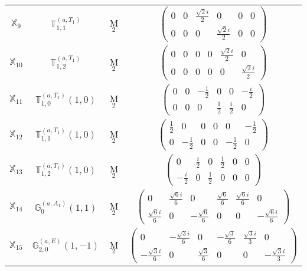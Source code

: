 \documentclass[fleqn,10pt,landscape]{article}
\begin{document}
\begin{itemize}
\begin{center}
\begin{longtable}{c|c|c|c}
$ \mathbb{X}_{9} $ & $\mathbb{T}_{1,1}^{(a,T_{1})}$ & M$_{2}$ & $\begin{pmatrix} 0 & 0 & \frac{\sqrt{2} i}{2} & 0 & 0 & 0 \\ 0 & 0 & 0 & \frac{\sqrt{2} i}{2} & 0 & 0 \end{pmatrix}$ \\
$ \mathbb{X}_{10} $ & $\mathbb{T}_{1,2}^{(a,T_{1})}$ & M$_{2}$ & $\begin{pmatrix} 0 & 0 & 0 & 0 & \frac{\sqrt{2} i}{2} & 0 \\ 0 & 0 & 0 & 0 & 0 & \frac{\sqrt{2} i}{2} \end{pmatrix}$ \\
$ \mathbb{X}_{11} $ & $\mathbb{T}_{1,0}^{(a,T_{1})}(1,0)$ & M$_{2}$ & $\begin{pmatrix} 0 & 0 & - \frac{1}{2} & 0 & 0 & - \frac{i}{2} \\ 0 & 0 & 0 & \frac{1}{2} & \frac{i}{2} & 0 \end{pmatrix}$ \\
$ \mathbb{X}_{12} $ & $\mathbb{T}_{1,1}^{(a,T_{1})}(1,0)$ & M$_{2}$ & $\begin{pmatrix} \frac{1}{2} & 0 & 0 & 0 & 0 & - \frac{1}{2} \\ 0 & - \frac{1}{2} & 0 & 0 & - \frac{1}{2} & 0 \end{pmatrix}$ \\
$ \mathbb{X}_{13} $ & $\mathbb{T}_{1,2}^{(a,T_{1})}(1,0)$ & M$_{2}$ & $\begin{pmatrix} 0 & \frac{i}{2} & 0 & \frac{1}{2} & 0 & 0 \\ - \frac{i}{2} & 0 & \frac{1}{2} & 0 & 0 & 0 \end{pmatrix}$ \\
$ \mathbb{X}_{14} $ & $\mathbb{G}_{0}^{(a,A_{1})}(1,1)$ & M$_{2}$ & $\begin{pmatrix} 0 & \frac{\sqrt{6} i}{6} & 0 & \frac{\sqrt{6}}{6} & \frac{\sqrt{6} i}{6} & 0 \\ \frac{\sqrt{6} i}{6} & 0 & - \frac{\sqrt{6}}{6} & 0 & 0 & - \frac{\sqrt{6} i}{6} \end{pmatrix}$ \\
$ \mathbb{X}_{15} $ & $\mathbb{G}_{2,0}^{(a,E)}(1,-1)$ & M$_{2}$ & $\begin{pmatrix} 0 & - \frac{\sqrt{3} i}{6} & 0 & - \frac{\sqrt{3}}{6} & \frac{\sqrt{3} i}{3} & 0 \\ - \frac{\sqrt{3} i}{6} & 0 & \frac{\sqrt{3}}{6} & 0 & 0 & - \frac{\sqrt{3} i}{3} \end{pmatrix}$ \\

\end{longtable}
\end{center}
\end{itemize}
\end{document}
